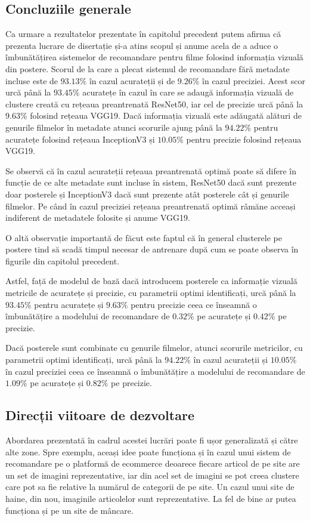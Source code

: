 \subsection*{Concluziile generale}

Ca urmare a rezultatelor prezentate în capitolul precedent putem afirma că prezenta lucrare de disertație și-a atins scopul și anume acela de a aduce o îmbunătățirea sistemelor de recomandare pentru filme folosind informația vizuală din postere. 
Scorul de la care a plecat sistemul de recomandare fără metadate incluse este de $93.13\%$ în cazul acurateții și de $9.26\%$ în cazul preciziei. Acest scor urcă până la $93.45\%$ acuratețe în cazul în care se adaugă informația vizuală de clustere creată cu rețeaua preantrenată ResNet50, iar cel de precizie urcă până la $9.63\%$ folosind rețeaua VGG19. Dacă informația vizuală este adăugată alături de genurile filmelor în metadate atunci scorurile ajung până la $94.22\%$ pentru acuratețe folosind rețeaua InceptionV3 și $10.05\%$ pentru precizie folosind rețeaua VGG19.

Se observă că în cazul acurateții rețeaua preantrenată optimă poate să difere în funcție de ce alte metadate sunt incluse în sistem, ResNet50 dacă sunt prezente doar posterele și InceptionV3 dacă sunt prezente atât posterele cât și genurile filmelor. Pe când în cazul preciziei rețeaua preantrenată optimă râmăne acceași indiferent de metadatele folosite și anume VGG19.

O altă observație importantă de făcut este faptul că în general clusterele pe postere tind să scadă timpul necesar de antrenare după cum se poate observa în figurile din capitolul precedent. 

Astfel, față de modelul de bază dacă introducem posterele ca informație vizuală metricile de acuratețe și precizie, cu parametrii optimi identificați, urcă până la $93.45\%$ pentru acuratețe și $9.63\%$ pentru precizie ceea ce înseamnă o îmbunătățire a modelului de recomandare de $0.32\%$ pe acuratețe și $0.42\%$ pe precizie.

Dacă posterele sunt combinate cu genurile filmelor, atunci scorurile metricilor, cu parametrii optimi identificați, urcă până la $94.22\%$ în cazul acurateții și $10.05\%$ în cazul preciziei ceea ce înseamnă o îmbunătățire a modelului de recomandare de $1.09\%$ pe acuratețe și $0.82\%$ pe precizie. 

\subsection*{Direcții viitoare de dezvoltare}
Abordarea prezentată în cadrul acestei lucrări poate fi ușor generalizată și către alte zone. Spre exemplu, aceași idee poate funcționa și în cazul unui sistem de recomandare pe o platformă de ecommerce deoarece fiecare articol de pe site are un set de imagini reprezentative, iar din acel set de imagini se pot creea clustere care pot sa fie relative la numărul de categorii de pe site. Un cazul unui site de haine, din nou, imaginile articolelor sunt reprezentative. La fel de bine ar putea funcționa și pe un site de mâncare. 

